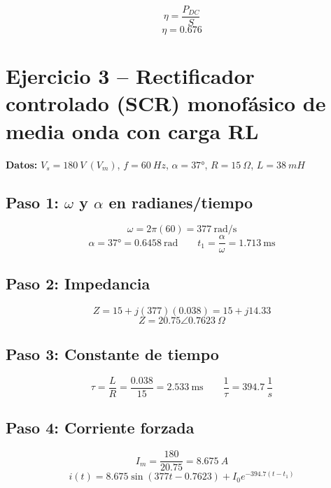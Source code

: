 \documentclass[12pt]{article}
\begin{document}
\begin{equation}
\eta=\frac{P_{DC}}{S}
\end{equation}
\begin{equation}
\boxed{\eta=0.676}
\end{equation}

\newpage
\section{Ejercicio 3 -- Rectificador controlado (SCR) monofásico de media onda con carga RL}

\textbf{Datos:} $V_s = 180\ V\ (V_m)$, $f = 60\ Hz$, $\alpha = 37°$, $R = 15\ \Omega$, $L = 38\ mH$

\subsection*{Paso 1: $\omega$ y $\alpha$ en radianes/tiempo}
\begin{equation}
\omega=2\pi(60)=377\ \text{rad/s}
\end{equation}
\begin{equation}
\alpha=37°=0.6458\ \text{rad} \qquad t_1=\frac{\alpha}{\omega}=1.713\ \text{ms}
\end{equation}

\subsection*{Paso 2: Impedancia}
\begin{equation}
Z=15+j(377)(0.038)=15+j14.33
\end{equation}
\begin{equation}
\boxed{Z=20.75\angle0.7623\ \Omega}
\end{equation}

\subsection*{Paso 3: Constante de tiempo}
\begin{equation}
\tau=\frac{L}{R}=\frac{0.038}{15}=2.533\ \text{ms} \qquad \frac{1}{\tau}=394.7\ \frac{1}{s}
\end{equation}

\subsection*{Paso 4: Corriente forzada}
\begin{equation}
I_m=\frac{180}{20.75}=8.675\ A
\end{equation}
\begin{equation}
i(t)=8.675\sin(377t-0.7623)+I_0e^{-394.7(t-t_1)}
\end{equation}
\end{document}
